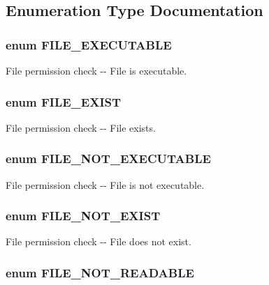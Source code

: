 \subsection{Enumeration Type Documentation}
\hypertarget{install_8inc_a03399711a43d84ee8783b8b1214dd429}{
\subsubsection[{FILE\_\-EXECUTABLE}]{\setlength{\rightskip}{0pt plus 5cm}enum {\bf FILE\_\-EXECUTABLE}}}
\label{install_8inc_a03399711a43d84ee8783b8b1214dd429}
File permission check -\/-\/ File is executable. \hypertarget{install_8inc_ae627ec3bb64949659adbc8cac5ae063e}{
\subsubsection[{FILE\_\-EXIST}]{\setlength{\rightskip}{0pt plus 5cm}enum {\bf FILE\_\-EXIST}}}
\label{install_8inc_ae627ec3bb64949659adbc8cac5ae063e}
File permission check -\/-\/ File exists. \hypertarget{install_8inc_a3c1acd6083afd2e6d977616f227fcf26}{
\subsubsection[{FILE\_\-NOT\_\-EXECUTABLE}]{\setlength{\rightskip}{0pt plus 5cm}enum {\bf FILE\_\-NOT\_\-EXECUTABLE}}}
\label{install_8inc_a3c1acd6083afd2e6d977616f227fcf26}
File permission check -\/-\/ File is not executable. \hypertarget{install_8inc_a2d02367d8fd76c70b1ffb77b24e62db9}{
\subsubsection[{FILE\_\-NOT\_\-EXIST}]{\setlength{\rightskip}{0pt plus 5cm}enum {\bf FILE\_\-NOT\_\-EXIST}}}
\label{install_8inc_a2d02367d8fd76c70b1ffb77b24e62db9}
File permission check -\/-\/ File does not exist. \hypertarget{install_8inc_ab09b4a70a73804ec35333d43a878a572}{
\subsubsection[{FILE\_\-NOT\_\-READABLE}]{\setlength{\rightskip}{0pt plus 5cm}enum {\bf FILE\_\-NOT\_\-READABLE}}}

